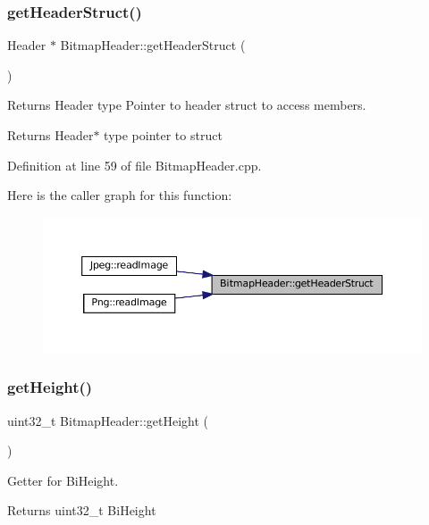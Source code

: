\subsubsection{\texorpdfstring{getHeaderStruct()}{getHeaderStruct()}}
{\footnotesize\ttfamily Header $\ast$ Bitmap\+Header\+::get\+Header\+Struct (\begin{DoxyParamCaption}{ }\end{DoxyParamCaption})}



Returns Header type Pointer to header struct to access members. 

\begin{DoxyReturn}{Returns}
Header$\ast$ type pointer to struct 
\end{DoxyReturn}


Definition at line 59 of file Bitmap\+Header.\+cpp.

Here is the caller graph for this function\+:\nopagebreak
\begin{figure}[H]
\begin{center}
\leavevmode
\includegraphics[width=350pt]{classBitmapHeader_a7ac69b70fce7b54c9cd3134a0e68ea58_icgraph}
\end{center}
\end{figure}
\mbox{\label{classBitmapHeader_a106f72d6c256327342029edf8e18bde1}} 
\subsubsection{\texorpdfstring{getHeight()}{getHeight()}}
{\footnotesize\ttfamily uint32\+\_\+t Bitmap\+Header\+::get\+Height (\begin{DoxyParamCaption}{ }\end{DoxyParamCaption})}



Getter for Bi\+Height. 

\begin{DoxyReturn}{Returns}
uint32\+\_\+t Bi\+Height 
\end{DoxyReturn}


